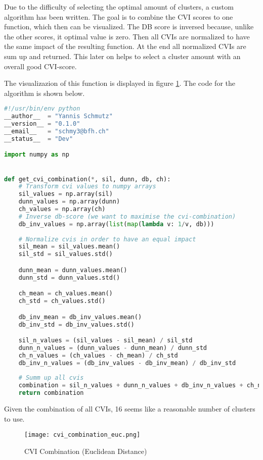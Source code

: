 \clearpage
Due to the difficulty of selecting the optimal amount of clusters, a custom algorithm has been written. The goal is to combine the CVI scores to one function, which then can be visualized. 
The DB score is inversed because, unlike the other scores, it optimal value is zero. Then all CVIs are normalized to have the same impact of the resulting function. At the end all normalized CVIs are sum up and returned. This later on helps to select a cluster amount with an overall good CVI-score.

The visualizazion of this function is displayed in figure \ref{fig:cvi_euc_combo}. The code for the algorithm is shown below.




\begin{lstlisting}[language=Python]
#!/usr/bin/env python
__author__  = "Yannis Schmutz"
__version__ = "0.1.0"
__email__   = "schmy3@bfh.ch"
__status__  = "Dev"

import numpy as np


def get_cvi_combination(*, sil, dunn, db, ch):
    # Transform cvi values to numpy arrays
    sil_values = np.array(sil)
    dunn_values = np.array(dunn)
    ch_values = np.array(ch)	
    # Inverse db-score (we want to maximise the cvi-combination)
    db_inv_values = np.array(list(map(lambda v: 1/v, db)))
	
    # Normalize cvis in order to have an equal impact
    sil_mean = sil_values.mean()
    sil_std = sil_values.std()

    dunn_mean = dunn_values.mean()
    dunn_std = dunn_values.std()

    ch_mean = ch_values.mean()
    ch_std = ch_values.std()

    db_inv_mean = db_inv_values.mean()
    db_inv_std = db_inv_values.std()

    sil_n_values = (sil_values - sil_mean) / sil_std
    dunn_n_values = (dunn_values - dunn_mean) / dunn_std
    ch_n_values = (ch_values - ch_mean) / ch_std
    db_inv_n_values = (db_inv_values - db_inv_mean) / db_inv_std
	
    # Summ up all cvis
    combination = sil_n_values + dunn_n_values + db_inv_n_values + ch_n_values
    return combination

\end{lstlisting}

\clearpage
Given the combination of all CVIs, 16 seems like a reasonable number of clusters to use.

\begin{figure}[h!]
	\texttt{[image: cvi\_combination\_euc.png]}
	\caption{CVI Combination (Euclidean Distance)}
	\label{fig:cvi_euc_combo}
\end{figure}


